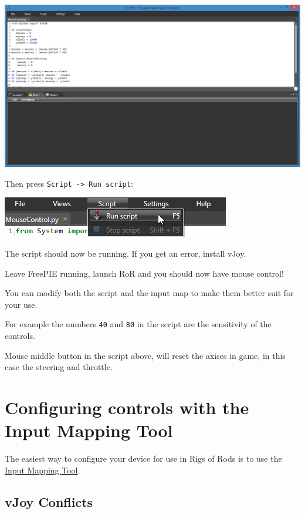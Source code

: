 \includegraphics{images/FreePIE-3.png}

Then press \texttt{Script\ -\textgreater{}\ Run\ script}:

\includegraphics{images/FreePIE-4.png}


The script should now be running. If you get an error, install vJoy.

Leave FreePIE running, launch RoR and you should now have mouse control!

You can modify both the script and the input map to make them better
suit for your use.

For example the numbers \texttt{40} and \texttt{80} in the script are
the sensitivity of the controls.

Mouse middle button in the script above, will reset the axises in game,
in this case the steering and throttle.

\hypertarget{configuring-controls-with-the-input-mapping-tool}{%
\section{Configuring controls with the Input Mapping
Tool}\label{configuring-controls-with-the-input-mapping-tool}}

The easiest way to configure your device for use in Rigs of Rods is to
use the
\href{https://forum.rigsofrods.org/resources/windows-input-mapping-tool.13/}{Input
Mapping Tool}.

\hypertarget{vjoy-conflicts}{%
\subsection{vJoy Conflicts}\label{vjoy-conflicts}}

